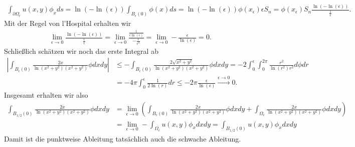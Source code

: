 \begin{solution}
\begin{align*}
  \int_{\partial \Omega_\epsilon}u(x,y)\phi_x ds
  = \ln(-\ln(\epsilon))\int_{B_\epsilon(0)}\phi(x) ds = \ln(-\ln(\epsilon))\phi(x_\epsilon)\epsilon S_n
  = \phi(x_\epsilon)S_n\frac{\ln(-\ln(\epsilon))}{\frac{1}{\epsilon}}.
\end{align*}
Mit der Regel von l'Hospital erhalten wir
\begin{align*}
  \lim_{\epsilon \to 0}\frac{\ln(-\ln(\epsilon))}{\frac{1}{\epsilon}}
  = \lim_{\epsilon \to 0}\frac{\frac{1}{\epsilon\ln(\epsilon)}}{-\frac{1}{\epsilon^2}}
  = \lim_{\epsilon \to 0}-\frac{\epsilon}{\ln(\epsilon)} = 0.
\end{align*}
Schließlich schätzen wir noch das erste Integral ab
\begin{align*}
  \left|\int_{B_\epsilon(0)}\frac{2x}{\ln(x^2+y^2)(x^2+y^2)}\phi dxdy\right|
  &\leq -\int_{B_\epsilon(0)}\frac{2\sqrt{x^2 +y^2}}{\ln(x^2+y^2)(x^2+y^2)}\phi dxdy
  = -2\int_0^\epsilon\int_0^{2\pi}\frac{r^2}{\ln(r^2)r^2} d\phi dr \\
  &= -4\pi\int_0^\epsilon \frac{1}{2\ln(r)} dr \leq -2\pi \frac{\epsilon}{\ln(\epsilon)}
  \xrightarrow{\epsilon \to 0} 0.
\end{align*}
Insgesamt erhalten wir also
\begin{align*}
\int_{B_{1/2}(0)}\frac{2x}{\ln(x^2+y^2)(x^2+y^2)}\phi dxdy &=
\lim_{\epsilon \to 0}\left(\int_{B_\epsilon(0)}\frac{2x}{\ln(x^2+y^2)(x^2+y^2)}\phi dxdy
+ \int_{\Omega_\epsilon}\frac{2x}{\ln(x^2+y^2)(x^2+y^2)}\phi dxdy\right) \\
&= \lim_{\epsilon \to 0}- \int_{\Omega_\epsilon}u(x,y)\phi_x dxdy
= \int_{B_{1/2}(0)}u(x,y)\phi_x dxdy
\end{align*}
Damit ist die punktweise Ableitung tatsächlich auch die schwache Ableitung.
\end{solution}


